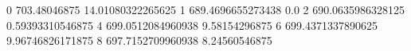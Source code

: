 0 703.48046875 14.01080322265625
1 689.4696655273438 0.0
2 690.0635986328125 0.59393310546875
4 699.0512084960938 9.58154296875
6 699.4371337890625 9.96746826171875
8 697.7152709960938 8.24560546875

